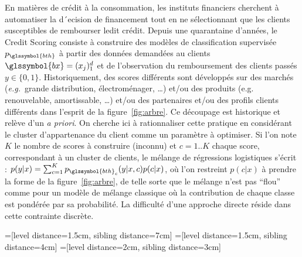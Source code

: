 En matières de crédit à la consommation, les instituts financiers cherchent à automatiser la d´ecision de financement tout en ne sélectionnant que les clients susceptibles de rembourser ledit crédit. Depuis une quarantaine d’années, le Credit Scoring consiste à construire des modèles de classification supervisée $p_{\glssymbol{bth}}$ à partir des données demandées au clients $\glssymbol{bx} = (x_j)_1^d$ et de l’observation du remboursement des clients passés $y \in \{0, 1\}$. Historiquement, des scores différents sont développés sur des marchés (\textit{e.g.}\ grande distribution, électroménager, \dots) et/ou des produits (e.g. renouvelable, amortissable, \dots) et/ou des partenaires et/ou des profils clients différents dans l’esprit de la figure~\ref{fig:arbre}. Ce découpage est historique et relève d’un \textit{a priori}. On cherche ici à rationnaliser cette pratique en considérant le cluster d’appartenance du client comme un paramètre à optimiser. Si l’on note $K$ le nombre de scores à construire (inconnu) et $c = 1..K$ chaque score, correspondant à un cluster de clients, le mélange de régressions logistiques s’écrit : $p(y|x) = \sum_{c=1}^K p_{\glssymbol{bth}_c}(y|x, c)p(c|x)$, où l’on restreint $p(c|x)$ à prendre la forme de la figure~\ref{fig:arbre}, de telle sorte que le mélange n’est pas “flou” comme pour un modèle de mélange classique où la contribution de chaque classe est pondérée par sa probabilité. La
difficulté d’une approche directe réside dans cette contrainte discrète.


=[level distance=1.5cm, sibling distance=7cm]
=[level distance=1.5cm, sibling distance=4cm]
=[level distance=2cm, sibling distance=3cm]

